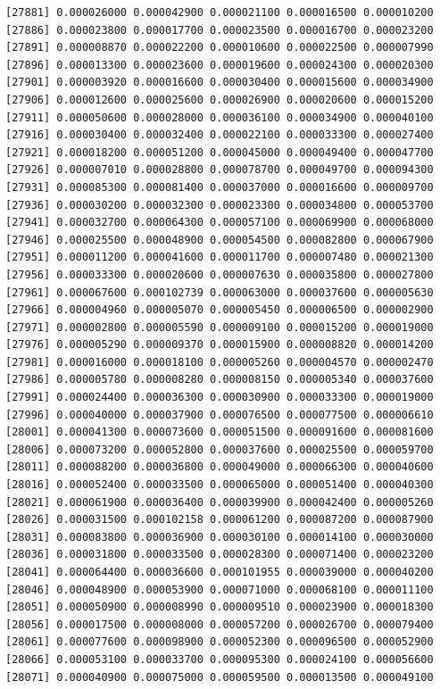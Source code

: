 \documentclass[]{article}
\begin{document}
\begin{verbatim}
[27881] 0.000026000 0.000042900 0.000021100 0.000016500 0.000010200
[27886] 0.000023800 0.000017700 0.000023500 0.000016700 0.000023200
[27891] 0.000008870 0.000022200 0.000010600 0.000022500 0.000007990
[27896] 0.000013300 0.000023600 0.000019600 0.000024300 0.000020300
[27901] 0.000003920 0.000016600 0.000030400 0.000015600 0.000034900
[27906] 0.000012600 0.000025600 0.000026900 0.000020600 0.000015200
[27911] 0.000050600 0.000028000 0.000036100 0.000034900 0.000040100
[27916] 0.000030400 0.000032400 0.000022100 0.000033300 0.000027400
[27921] 0.000018200 0.000051200 0.000045000 0.000049400 0.000047700
[27926] 0.000007010 0.000028800 0.000078700 0.000049700 0.000094300
[27931] 0.000085300 0.000081400 0.000037000 0.000016600 0.000009700
[27936] 0.000030200 0.000032300 0.000023300 0.000034800 0.000053700
[27941] 0.000032700 0.000064300 0.000057100 0.000069900 0.000068000
[27946] 0.000025500 0.000048900 0.000054500 0.000082800 0.000067900
[27951] 0.000011200 0.000041600 0.000011700 0.000007480 0.000021300
[27956] 0.000033300 0.000020600 0.000007630 0.000035800 0.000027800
[27961] 0.000067600 0.000102739 0.000063000 0.000037600 0.000005630
[27966] 0.000004960 0.000005070 0.000005450 0.000006500 0.000002900
[27971] 0.000002800 0.000005590 0.000009100 0.000015200 0.000019000
[27976] 0.000005290 0.000009370 0.000015900 0.000008820 0.000014200
[27981] 0.000016000 0.000018100 0.000005260 0.000004570 0.000002470
[27986] 0.000005780 0.000008280 0.000008150 0.000005340 0.000037600
[27991] 0.000024400 0.000036300 0.000030900 0.000033300 0.000019000
[27996] 0.000040000 0.000037900 0.000076500 0.000077500 0.000006610
[28001] 0.000041300 0.000073600 0.000051500 0.000091600 0.000081600
[28006] 0.000073200 0.000052800 0.000037600 0.000025500 0.000059700
[28011] 0.000088200 0.000036800 0.000049000 0.000066300 0.000040600
[28016] 0.000052400 0.000033500 0.000065000 0.000051400 0.000040300
[28021] 0.000061900 0.000036400 0.000039900 0.000042400 0.000005260
[28026] 0.000031500 0.000102158 0.000061200 0.000087200 0.000087900
[28031] 0.000083800 0.000036900 0.000030100 0.000014100 0.000030000
[28036] 0.000031800 0.000033500 0.000028300 0.000071400 0.000023200
[28041] 0.000064400 0.000036600 0.000101955 0.000039000 0.000040200
[28046] 0.000048900 0.000053900 0.000071000 0.000068100 0.000011100
[28051] 0.000050900 0.000008990 0.000009510 0.000023900 0.000018300
[28056] 0.000017500 0.000008000 0.000057200 0.000026700 0.000079400
[28061] 0.000077600 0.000098900 0.000052300 0.000096500 0.000052900
[28066] 0.000053100 0.000033700 0.000095300 0.000024100 0.000056600
[28071] 0.000040900 0.000075000 0.000059500 0.000013500 0.000049100

\end{verbatim}
\end{document}
